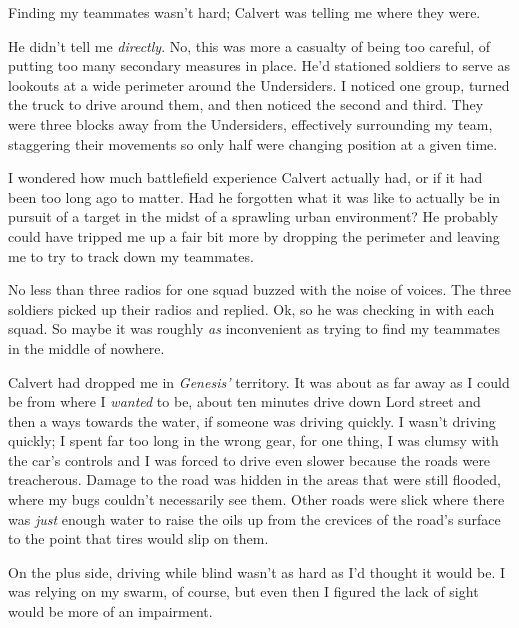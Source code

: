 





Finding my teammates wasn't hard; Calvert was telling me where they were.



He didn't tell me \emph{directly}.  No, this was more a casualty of being too careful, of putting too many secondary measures in place.  He'd stationed soldiers to serve as lookouts at a wide perimeter around the Undersiders.  I noticed one group, turned the truck to drive around them, and then noticed the second and third.  They were three blocks away from the Undersiders, effectively surrounding my team, staggering their movements so only half were changing position at a given time.



I wondered how much battlefield experience Calvert actually had, or if it had been too long ago to matter.  Had he forgotten what it was like to actually be in pursuit of a target in the midst of a sprawling urban environment?  He probably could have tripped me up a fair bit more by dropping the perimeter and leaving me to try to track down my teammates.



No less than three radios for one squad buzzed with the noise of voices.  The three soldiers picked up their radios and replied.  Ok, so he was checking in with each squad.  So maybe it was roughly \emph{as} inconvenient as trying to find my teammates in the middle of nowhere.



Calvert had dropped me in \emph{Genesis' } territory.  It was about as far away as I could be from where I \emph{wanted} to be, about ten minutes drive down Lord street and then a ways towards the water, if someone was driving quickly.  I wasn't driving quickly; I spent far too long in the wrong gear, for one thing, I was clumsy with the car's controls and I was forced to drive even slower because the roads were treacherous.  Damage to the road was hidden in the areas that were still flooded, where my bugs couldn't necessarily see them.   Other roads were slick where there was \emph{just} enough water to raise the oils up from the crevices of the road's surface to the point that tires would slip on them.



On the plus side, driving while blind wasn't as hard as I'd thought it would be.  I was relying on my swarm, of course, but even then I figured the lack of sight would be more of an impairment.



